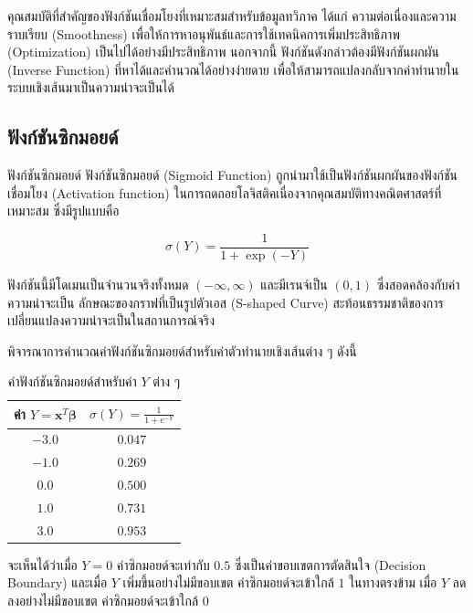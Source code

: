คุณสมบัติที่สำคัญของฟังก์ชันเชื่อมโยงที่เหมาะสมสำหรับข้อมูลทวิภาค ได้แก่ ความต่อเนื่องและความราบเรียบ (Smoothness) เพื่อให้การหาอนุพันธ์และการใช้เทคนิคการเพิ่มประสิทธิภาพ (Optimization) เป็นไปได้อย่างมีประสิทธิภาพ นอกจากนี้ ฟังก์ชันดังกล่าวต้องมีฟังก์ชันผกผัน (Inverse Function) ที่หาได้และคำนวณได้อย่างง่ายดาย เพื่อให้สามารถแปลงกลับจากค่าทำนายในระบบเชิงเส้นมาเป็นความน่าจะเป็นได้

\subsection{ฟังก์ชันซิกมอยด์}
\begin{myBox}[]{ฟังก์ชันซิกมอยด์}{}
ฟังก์ชันซิกมอยด์ (Sigmoid Function) ถูกนำมาใช้เป็นฟังก์ชันผกผันของฟังก์ชันเชื่อมโยง (Activation function) ในการถดถอยโลจิสติคเนื่องจากคุณสมบัติทางคณิตศาสตร์ที่เหมาะสม  ซึ่งมีรูปแบบคือ

$$\sigma(Y) = \frac{1}{1 + \exp(-Y)}$$

ฟังก์ชันนี้มีโดเมนเป็นจำนวนจริงทั้งหมด $(-\infty, \infty)$ และมีเรนจ์เป็น $(0, 1)$ ซึ่งสอดคล้องกับค่าความน่าจะเป็น ลักษณะของกราฟที่เป็นรูปตัวเอส (S-shaped Curve) สะท้อนธรรมชาติของการเปลี่ยนแปลงความน่าจะเป็นในสถานการณ์จริง
\end{myBox}

\begin{exmp}
\label{exmp:sigmoid_calculation}
พิจารณาการคำนวณค่าฟังก์ชันซิกมอยด์สำหรับค่าตัวทำนายเชิงเส้นต่าง ๆ ดังนี้

\begin{table}[h!]
\centering
\caption{ค่าฟังก์ชันซิกมอยด์สำหรับค่า $Y$ ต่าง ๆ}
\label{tab:sigmoid_values}
\begin{tabular}{|c|c|}
\hline
\textbf{ค่า $Y = \mathbf{x}^T\boldsymbol{\beta}$} & $\sigma(Y) = \frac{1}{1+e^{-Y}}$ \\ \hline
$-3.0$ & $0.047$ \\ \hline
$-1.0$ & $0.269$ \\ \hline
$0.0$ & $0.500$ \\ \hline
$1.0$ & $0.731$ \\ \hline
$3.0$ & $0.953$ \\ \hline
\end{tabular}
\end{table}

จะเห็นได้ว่าเมื่อ $Y = 0$ ค่าซิกมอยด์จะเท่ากับ $0.5$ ซึ่งเป็นค่าขอบเขตการตัดสินใจ (Decision Boundary) และเมื่อ $Y$ เพิ่มขึ้นอย่างไม่มีขอบเขต ค่าซิกมอยด์จะเข้าใกล้ $1$ ในทางตรงข้าม เมื่อ $Y$ ลดลงอย่างไม่มีขอบเขต ค่าซิกมอยด์จะเข้าใกล้ $0$
\end{exmp}

